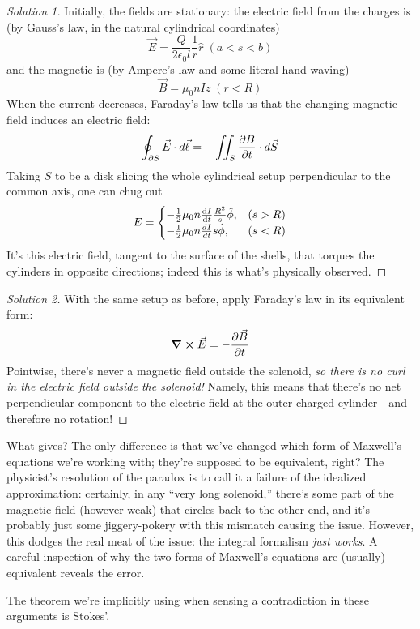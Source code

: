 \documentclass{article}
\begin{document}
\begin{proof}[Solution 1]
  Initially, the fields are stationary: the electric field from the charges is (by Gauss's law, in the natural cylindrical coordinates)
  \[
    \vec{E} = \frac{Q}{2\epsilon_{0}l}\frac{1}{r}\hat{r} \; (a < s < b)
  \]
  and the magnetic is (by Ampere's law and some literal hand-waving)
  \[
    \vec{B} = \mu_{0}nI\hat{z} \; (r < R)
  \]
  When the current decreases, Faraday's law tells us that the changing magnetic field induces an electric field:
  \[
    \oint_{\partial S} \vec{E} \cdot d\vec{\ell} = -\iint_{S} \pdv{B}{t} \cdot d\vec{S}
  \]
  Taking $S$ to be a disk slicing the whole cylindrical setup perpendicular to the common axis, one can chug out
  \[
    E =
    \begin{cases}
      -\frac{1}{2}\mu_{0}n\dv{I}{t}\frac{R^{2}}{s}\hat{\phi}, & (s > R) \\
      -\frac{1}{2}\mu_{0}n\frac{dI}{dt}s\hat{\phi}, & (s < R)
    \end{cases}
  \]
  It's this electric field, tangent to the surface of the shells, that torques the cylinders in opposite directions;
  indeed this is what's physically observed.
\end{proof}

\begin{proof}[Solution 2]
  With the same setup as before, apply Faraday's law in its equivalent form:
  \[
    \curl{\vec{E}} = -\pdv{\vec{B}}{t}
  \]
  Pointwise, there's never a magnetic field outside the solenoid, \textit{so there is no curl in the electric field outside the solenoid!}
  Namely, this means that there's no net perpendicular component to the electric field at the outer charged cylinder---and therefore no rotation!
\end{proof}

What gives?
The only difference is that we've changed which form of Maxwell's equations we're working with; they're supposed to be equivalent, right?
The physicist's resolution of the paradox is to call it a failure of the idealized approximation: certainly, in any ``very long solenoid,''
there's some part of the magnetic field (however weak) that circles back to the other end,
and it's probably just some jiggery-pokery with this mismatch causing the issue.
However, this dodges the real meat of the issue: the integral formalism \textit{just works}.
A careful inspection of why the two forms of Maxwell's equations are (usually) equivalent reveals the error.

The theorem we're implicitly using when sensing a contradiction in these arguments is Stokes'.
\end{document}

